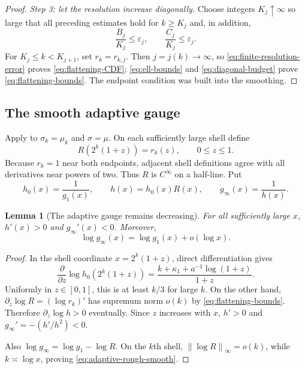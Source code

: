 \documentclass[11pt,oneside]{article}
\numberwithin{equation}{section}
\newtheorem{lemma}[theorem]{Lemma}
\theoremstyle{definition}
\theoremstyle{remark}
\newcommand{\norm}[1]{\left\lVert#1\right\rVert}
\begin{document}
\begin{proof}
\emph{Step 3: let the resolution increase diagonally.}
Choose integers \(K_j\uparrow\infty\) so large that all preceding estimates hold for
\(k\ge K_j\) and, in addition,
\begin{equation}
 \frac{B_j}{K_j}\le\varepsilon_j,
 \qquad
 \frac{C_j}{K_j}\le\varepsilon_j.
 \label{eq:diagonal-budget}
\end{equation}
For \(K_j\le k<K_{j+1}\), set \(r_k=r_{k,j}\).  Then \(j=j(k)\to\infty\), so
\eqref{eq:finite-resolution-error} proves \eqref{eq:flattening-CDF};
\eqref{eq:ell-bounds} and \eqref{eq:diagonal-budget} prove
\eqref{eq:flattening-bounds}.  The endpoint condition was built into the smoothing.
\end{proof}

\subsection{The smooth adaptive gauge}

Apply  to \(\sigma_k=\mu_k\) and \(\sigma=\mu\).  On each sufficiently
large shell define
\begin{equation}
 R(2^k(1+z))=r_k(z),
 \qquad 0\le z\le1.
 \label{eq:R-global}
\end{equation}
Because \(r_k=1\) near both endpoints, adjacent shell definitions agree with all derivatives
near powers of two.  Thus \(R\) is \(C^\infty\) on a half-line.  Put
\begin{equation}
 h_0(x)=\frac1{g_1(x)},
 \qquad h(x)=h_0(x)R(x),
 \qquad g_\infty(x)=\frac1{h(x)}.
 \label{eq:smooth-adaptive}
\end{equation}

\begin{lemma}[The adaptive gauge remains decreasing]
\label{lem:adaptive-monotone}
For all sufficiently large \(x\), \(h'(x)>0\) and \(g_\infty'(x)<0\).  Moreover,
\begin{equation}
 \log g_\infty(x)=\log g_1(x)+o(\log x).
 \label{eq:adaptive-rough-smooth}
\end{equation}
\end{lemma}

\begin{proof}
In the shell coordinate \(x=2^k(1+z)\), direct differentiation gives
\begin{equation}
 \frac{\partial}{\partial z}\log h_0(2^k(1+z))
 =\frac{k+\kappa_1+a^{-1}\log(1+z)}{1+z}.
 \label{eq:baseline-slope}
\end{equation}
Uniformly in \(z\in[0,1]\), this is at least \(k/3\) for large \(k\).  On the other hand,
\(
 \partial_z\log R=(\log r_k)'
\) has supremum norm \(o(k)\) by \eqref{eq:flattening-bounds}.  Therefore
\(\partial_z\log h>0\) eventually.  Since \(z\) increases with \(x\), \(h'>0\) and
\(g_\infty'=-(h'/h^2)<0\).

Also \(\log g_\infty=\log g_1-\log R\).  On the \(k\)th shell,
\(\norm{\log R}_\infty=o(k)\), while \(k\asymp\log x\), proving
\eqref{eq:adaptive-rough-smooth}.
\end{proof}
\end{document}
